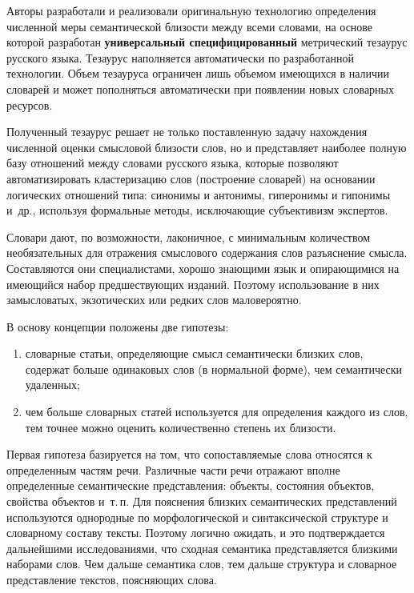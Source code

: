 \begin{multicols}{2}
     Авторы разработали и реализовали оригинальную технологию 
определения численной меры семантической близости между всеми словами, 
на основе которой разработан \textbf{универсальный специфицированный} 
метрический тезаурус русского языка. Тезаурус наполняется автоматически по 
разработанной технологии. Объем тезауруса ограничен лишь объемом 
имеющихся в наличии словарей и может пополняться автоматически при 
появлении новых словарных ресурсов.
     
     Полученный тезаурус решает не только поставленную задачу нахождения 
численной оценки смысловой близости слов, но и представляет наиболее 
полную базу отношений между словами русского языка, которые позволяют 
автоматизировать кластеризацию слов (построение словарей) на основании 
логических отношений типа: синонимы и антонимы, гиперонимы и гипонимы 
и~др., используя формальные методы, исключающие субъективизм экспертов.
     
     Словари дают, по возможности, лаконичное, с минимальным 
количеством необязательных для отражения смыслового содержания слов 
разъяснение смысла. Составляются они специалистами, хорошо знающими 
язык и опирающимися на имеющийся набор предшествующих изданий. 
Поэтому использование в них замысловатых, экзотических или редких слов 
маловероятно. 
     
     В основу концепции положены две гипотезы:
     \begin{enumerate}[(1)]
\item словарные статьи, определяющие смысл семантически близких 
слов, содержат больше одинаковых слов (в нормальной форме), чем 
семантически удаленных;
\item чем больше словарных статей используется для определения каждого 
из слов, тем точнее можно оценить количественно степень их близости.
\end{enumerate}

     Первая гипотеза базируется на том, что со\-по\-став\-ля\-емые слова относятся 
к определенным час\-тям речи. Различные час\-ти речи отражают вполне 
определенные семантические пред\-став\-ле\-ния: объекты, состояния объектов, 
свойства объектов и~т.\,п. Для пояснения близких семантических 
пред\-став\-ле\-ний используются однородные по морфологической и 
синтаксической структуре и словарному со\-ста\-ву тексты. Поэтому логично 
ожидать, и это подтверждается дальнейшими исследованиями, что сходная 
семантика представляется близкими наборами слов. Чем дальше семантика 
слов, тем дальше структура и словарное представление текстов, поясняющих 
слова.
     

\end{multicols}
